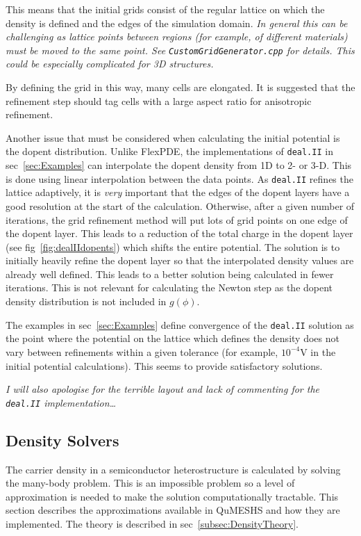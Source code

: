 \documentclass[12pt]{article}
\newcommand{\red}[1]{{\color{red} \it #1}}
\begin{document}
{This means that the initial grids consist of the regular lattice on which the density
is defined and the edges of the simulation domain.  \red{In general this can be
challenging as lattice points between regions (for example, of different materials)
must be moved to the same point.  See \texttt{CustomGridGenerator.cpp} for details.
This could be especially complicated for 3D structures.}

By defining the grid in this way, many cells are elongated.  It is suggested that
the refinement step should tag cells with a large aspect ratio for anisotropic
refinement.

Another issue that must be considered when calculating the initial potential is the
dopent distribution.  Unlike FlexPDE, the implementations of \texttt{deal.II} in
sec~\ref{sec:Examples} can interpolate the dopent density from 1D to 2- or 3-D.
This is done using linear interpolation between the data points.  As \texttt{deal.II}
refines the lattice adaptively, it is \emph{\color{red} very} important that the edges
of the dopent layers have a good resolution at the start of the calculation.  Otherwise,
after a given number of iterations, the grid refinement method will put lots of grid
points on one edge of the dopent layer.  This leads to a reduction of the total charge
in the dopent layer (see fig~\ref{fig:dealIIdopents}) which shifts the entire
potential.  The solution is to initially heavily refine the dopent layer so that the
interpolated density values are already well defined.  This leads to a better solution
being calculated in fewer iterations.  This is not relevant for calculating the
Newton step as the dopent density distribution is not included in $g(\phi)$.

The examples in sec~\ref{sec:Examples} define convergence of the \texttt{deal.II}
solution as the point where the potential on the lattice which defines the density
does not vary between refinements within a given tolerance (for example, $10^{-4}$V
in the initial potential calculations).  This seems to provide satisfactory
solutions.


\red{I will also apologise for the terrible layout and lack of commenting for the
\texttt{deal.II} implementation\ldots}


\subsection{Density Solvers}

The carrier density in a semiconductor heterostructure is calculated by solving
the many-body problem.  This is an impossible problem so a level of approximation
is needed to make the solution computationally tractable.  This section describes
the approximations available in QuMESHS and how they are implemented.  The theory
is described in sec~\ref{subsec:DensityTheory}.

}
\end{document}
